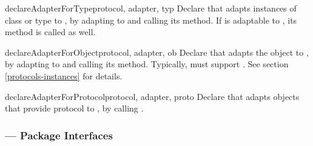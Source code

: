 \begin{verbatim%
}
\begin{verbatim%
}
\begin{verbatim%
}
\begin{verbatim%
}
\begin{verbatim%
}
\begin{verbatim%
}
\begin{funcdesc}{declareAdapterForType}{protocol, adapter, typ }
Declare that  adapts instances of class or type 
to , by adapting  to  and
calling its  method.  If  is adaptable
to , its  method is
called as well.
\end{funcdesc}

\begin{funcdesc}{declareAdapterForObject}{protocol, adapter, ob }
Declare that  adapts the object  to , by
adapting  to  and calling its
 method.  Typically,  must support
.  See section \ref{protocols-instances} for details.
\end{funcdesc}

\begin{funcdesc}{declareAdapterForProtocol}{protocol, adapter, proto }
Declare that  adapts objects that provide protocol 
to , by calling
.

\end{funcdesc}

































\newpage
\subsubsection{ --- Package Interfaces\label{protocols-interfaces-module}}



\end{verbatim%
}
\end{verbatim%
}
\end{verbatim%
}
\end{verbatim%
}
\end{verbatim%
}
\end{verbatim%
}
